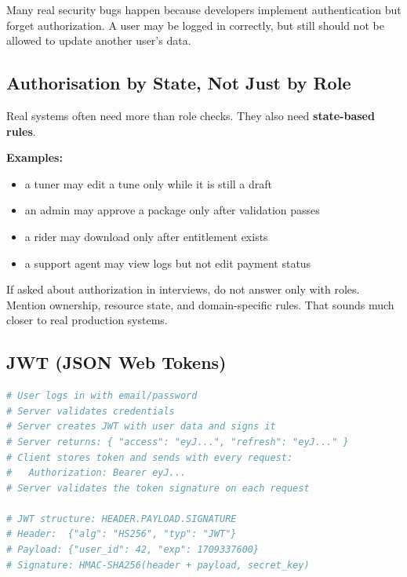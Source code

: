 \documentclass[12pt, a4paper, oneside]{book}
\begin{document}
\begin{warningbox}
Many real security bugs happen because developers implement authentication but forget authorization. A user may be logged in correctly, but still should not be allowed to update another user's data.
\end{warningbox}

\subsection{Authorisation by State, Not Just by Role}

Real systems often need more than role checks. They also need \textbf{state-based rules}.

\textbf{Examples:}
\begin{itemize}[leftmargin=2em]
    \item a tuner may edit a tune only while it is still a draft
    \item an admin may approve a package only after validation passes
    \item a rider may download only after entitlement exists
    \item a support agent may view logs but not edit payment status
\end{itemize}

\begin{examtipbox}
If asked about authorization in interviews, do not answer only with roles. Mention ownership, resource state, and domain-specific rules. That sounds much closer to real production systems.
\end{examtipbox}

\subsection{JWT (JSON Web Tokens)}
\begin{lstlisting}[language=Python, caption={JWT flow}]
# User logs in with email/password
# Server validates credentials
# Server creates JWT with user data and signs it
# Server returns: { "access": "eyJ...", "refresh": "eyJ..." }
# Client stores token and sends with every request:
#   Authorization: Bearer eyJ...
# Server validates the token signature on each request

# JWT structure: HEADER.PAYLOAD.SIGNATURE
# Header:  {"alg": "HS256", "typ": "JWT"}
# Payload: {"user_id": 42, "exp": 1709337600}
# Signature: HMAC-SHA256(header + payload, secret_key)
\end{lstlisting}
\end{document}
